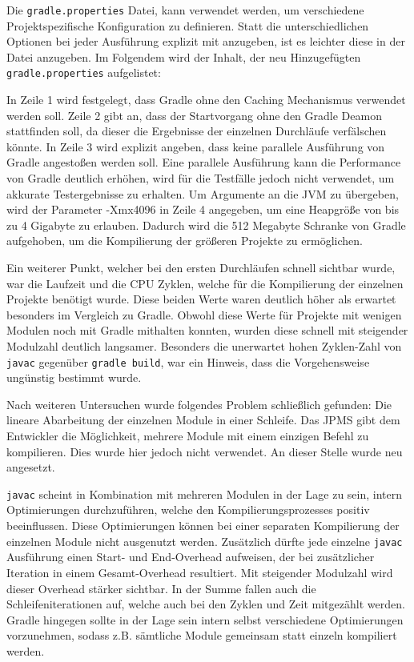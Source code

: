 Die \texttt{gradle.properties} Datei, kann verwendet werden, um verschiedene Projektspezifische Konfiguration zu definieren. 
Statt die unterschiedlichen Optionen bei jeder Ausführung explizit mit anzugeben, ist es leichter diese in der Datei anzugeben.
Im Folgendem wird der Inhalt, der neu Hinzugefügten \texttt{gradle.properties} aufgelistet:

\begin{figure}[hbt!]
	
\end{figure}

In Zeile 1 wird festgelegt, dass Gradle ohne den Caching Mechanismus verwendet werden soll.
Zeile 2 gibt an, dass der Startvorgang ohne den Gradle Deamon stattfinden soll, da dieser die Ergebnisse der einzelnen Durchläufe verfälschen könnte.
In Zeile 3 wird explizit angeben, dass keine parallele Ausführung von Gradle angestoßen werden soll. 
Eine parallele  Ausführung kann die Performance von Gradle deutlich erhöhen, wird für die Testfälle jedoch nicht verwendet, um akkurate Testergebnisse zu erhalten. 
Um Argumente an die JVM zu übergeben, wird der Parameter -Xmx4096 in Zeile 4 angegeben, um eine Heapgröße von bis zu 4 Gigabyte zu erlauben. 
Dadurch wird die 512 Megabyte Schranke von Gradle aufgehoben, um die Kompilierung der größeren Projekte zu ermöglichen.

Ein weiterer Punkt, welcher bei den ersten Durchläufen schnell sichtbar wurde, war die Laufzeit und die CPU Zyklen, welche für die Kompilierung der einzelnen Projekte benötigt wurde.
Diese beiden Werte waren deutlich höher als erwartet besonders im Vergleich zu Gradle.
Obwohl diese Werte für Projekte mit wenigen Modulen noch mit Gradle mithalten konnten, wurden diese schnell mit steigender Modulzahl deutlich langsamer.
Besonders die unerwartet hohen Zyklen-Zahl von \texttt{javac} gegenüber \texttt{gradle build}, war ein Hinweis, dass die Vorgehensweise ungünstig bestimmt wurde.

Nach weiteren Untersuchen wurde folgendes Problem schließlich gefunden: Die lineare Abarbeitung der einzelnen Module in einer Schleife.
Das JPMS gibt dem Entwickler die Möglichkeit, mehrere Module mit einem einzigen Befehl zu kompilieren.
Dies wurde hier jedoch nicht verwendet.
An dieser Stelle wurde neu angesetzt.

\texttt{javac} scheint in Kombination mit mehreren Modulen in der Lage zu sein, intern Optimierungen durchzuführen, welche den Kompilierungsprozesses positiv beeinflussen.
Diese Optimierungen können bei einer separaten Kompilierung der einzelnen Module nicht ausgenutzt werden.
Zusätzlich dürfte jede einzelne \texttt{javac} Ausführung einen Start- und End-Overhead aufweisen, der bei zusätzlicher Iteration in einem Gesamt-Overhead resultiert.
Mit steigender Modulzahl wird dieser Overhead stärker sichtbar.
In der Summe fallen auch die Schleifeniterationen auf, welche auch bei den Zyklen und Zeit mitgezählt werden.
Gradle hingegen sollte in der Lage sein intern selbst verschiedene Optimierungen vorzunehmen, sodass z.B. sämtliche Module gemeinsam statt einzeln kompiliert werden.

